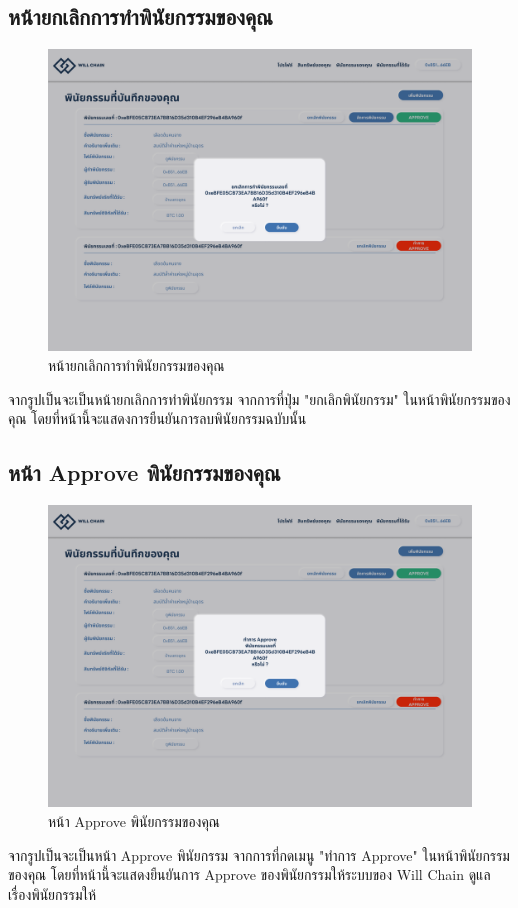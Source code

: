 \documentclass[12pt,oneside,openright,a4paper]{cpe-thai-project}
\begin{document}
\subsection{หน้ายกเลิกการทำพินัยกรรมของคุณ}
		\begin{figure}[!thb]
			\centering
			\includegraphics[scale=0.2]{cancelWill}
			\caption{หน้ายกเลิกการทำพินัยกรรมของคุณ}
		\end{figure}
		\FloatBarrier
		\tab จากรูปเป็นจะเป็นหน้ายกเลิกการทำพินัยกรรม จากการที่ปุ่ม "ยกเลิกพินัยกรรม" ในหน้าพินัยกรรมของคุณ โดยที่หน้านี้จะแสดงการยืนยันการลบพินัยกรรมฉบับนั้น
\subsection{หน้า Approve พินัยกรรมของคุณ}
		\begin{figure}[!thb]
			\centering
			\includegraphics[scale=0.2]{WillApprove}
			\caption{หน้า Approve พินัยกรรมของคุณ}
		\end{figure}
		\FloatBarrier
		\tab จากรูปเป็นจะเป็นหน้า Approve พินัยกรรม จากการที่กดเมนู "ทำการ Approve" ในหน้าพินัยกรรมของคุณ โดยที่หน้านี้จะแสดงยืนยันการ Approve ของพินัยกรรมให้ระบบของ Will Chain ดูแลเรื่องพินัยกรรมให้
\end{document}
